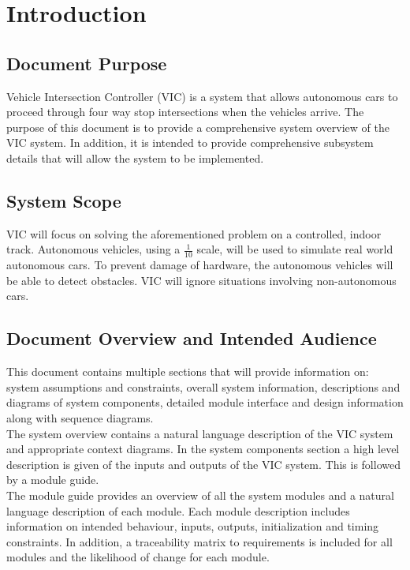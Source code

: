 \documentclass [10pt]{article}
\begin{document}
\section {Introduction}

\subsection{Document Purpose}




Vehicle Intersection Controller (VIC) is a system that allows autonomous cars to proceed through four way stop intersections when the vehicles arrive. The purpose of this document is to provide a comprehensive system overview of the VIC  system. In addition, it is intended to provide comprehensive subsystem details that will allow the system to be implemented.  


\subsection{System Scope}
VIC will focus on solving the aforementioned problem on a controlled, indoor track.  Autonomous vehicles, using a $\frac{1}{10}$ scale, will be used to simulate real world autonomous cars. To prevent damage of hardware, the autonomous vehicles will be able to detect obstacles. VIC will ignore situations involving non-autonomous cars. 




\subsection{Document Overview and Intended Audience}
This document contains multiple sections that will provide information on: system assumptions and constraints,  overall system information, descriptions and diagrams of system components, detailed module interface and design information along with sequence diagrams. \\

The system overview contains a natural language description of the VIC system and appropriate context diagrams. In the system components section a high level description is given of the inputs and outputs of the VIC system. This is followed by a module guide. \\

The module guide provides an overview of all the system modules and a natural language description of each module. Each module description includes information on intended behaviour, inputs, outputs, initialization and timing constraints. In addition, a traceability matrix to requirements is included for all modules and the likelihood of change for each module.  \\
\end{document}
